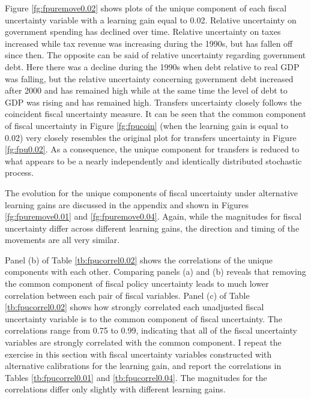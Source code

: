 \documentclass[11pt]{article}
\begin{document}
Figure \ref{fg:fpuremove0.02} shows plots of the unique component of each fiscal uncertainty variable with a learning gain equal to 0.02.  Relative uncertainty on government spending has declined over time.  Relative uncertainty on taxes increased while tax revenue was increasing during the 1990s, but has fallen off since then.  The opposite can be said of relative uncertainty regarding government debt.  Here there was a decline during the 1990s when debt relative to real GDP was falling, but the relative uncertainty concerning government debt increased after 2000 and has remained high while at the same time the level of debt to GDP was rising and has remained high.  Transfers uncertainty closely follows the coincident fiscal uncertainty measure.  It can be seen that the common component of fiscal uncertainty in Figure \ref{fg:fpucoin} (when the learning gain is equal to 0.02) very closely resembles the original plot for transfers uncertainty in Figure \ref{fg:fpu0.02}.  As a consequence, the unique component for transfers is reduced to what appears to be a nearly independently and identically distributed stochastic process. 

The evolution for the unique components of fiscal uncertainty under alternative learning gains are discussed in the appendix and shown in Figures \ref{fg:fpuremove0.01} and \ref{fg:fpuremove0.04}.  Again, while the magnitudes for fiscal uncertainty differ across different learning gains, the direction and timing of the movements are all very similar.

Panel (b) of Table \ref{tb:fpucorrel0.02} shows the correlations of the unique components with each other.  Comparing panels (a) and (b) reveals that removing the common component of fiscal policy uncertainty leads to much lower correlation between each pair of fiscal variables.  Panel (c) of Table \ref{tb:fpucorrel0.02} shows how strongly correlated each unadjusted fiscal uncertainty variable is to the common component of fiscal uncertainty.  The correlations range from 0.75 to 0.99, indicating that all of the fiscal uncertainty variables are strongly correlated with the common component.  I repeat the exercise in this section with fiscal uncertainty variables constructed with alternative calibrations for the learning gain, and report the correlations in Tables \ref{tb:fpucorrel0.01} and \ref{tb:fpucorrel0.04}.  The magnitudes for the correlations differ only slightly with different learning gains. 
\end{document}

